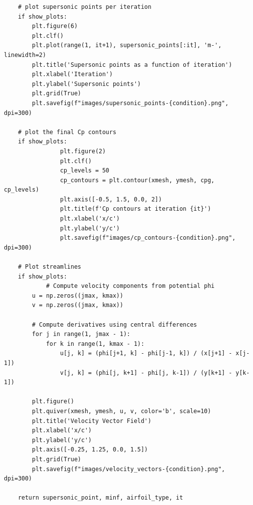 \documentclass[12pt]{article}
\theoremstyle{definition}
\begin{document}
\begin{verbatim}
    # plot supersonic points per iteration
    if show_plots:
        plt.figure(6)
        plt.clf()
        plt.plot(range(1, it+1), supersonic_points[:it], 'm-', linewidth=2)
        plt.title('Supersonic points as a function of iteration')
        plt.xlabel('Iteration')
        plt.ylabel('Supersonic points')
        plt.grid(True)
        plt.savefig(f"images/supersonic_points-{condition}.png", dpi=300)
    
    # plot the final Cp contours
    if show_plots:
                plt.figure(2)
                plt.clf()
                cp_levels = 50
                cp_contours = plt.contour(xmesh, ymesh, cpg, cp_levels)
                plt.axis([-0.5, 1.5, 0.0, 2])
                plt.title(f'Cp contours at iteration {it}')
                plt.xlabel('x/c')
                plt.ylabel('y/c')
                plt.savefig(f"images/cp_contours-{condition}.png", dpi=300)
  
    # Plot streamlines
    if show_plots:
            # Compute velocity components from potential phi
        u = np.zeros((jmax, kmax))
        v = np.zeros((jmax, kmax))

        # Compute derivatives using central differences
        for j in range(1, jmax - 1):
            for k in range(1, kmax - 1):
                u[j, k] = (phi[j+1, k] - phi[j-1, k]) / (x[j+1] - x[j-1])
                v[j, k] = (phi[j, k+1] - phi[j, k-1]) / (y[k+1] - y[k-1])
                
        plt.figure()
        plt.quiver(xmesh, ymesh, u, v, color='b', scale=10)
        plt.title('Velocity Vector Field')
        plt.xlabel('x/c')
        plt.ylabel('y/c')
        plt.axis([-0.25, 1.25, 0.0, 1.5])
        plt.grid(True)
        plt.savefig(f"images/velocity_vectors-{condition}.png", dpi=300)
    
    return supersonic_point, minf, airfoil_type, it

\end{verbatim}
\end{document}
